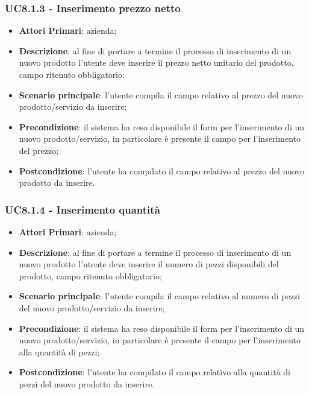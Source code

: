 \subsubsection{UC8.1.3 - Inserimento prezzo netto}
\begin{itemize}
	\item \textbf{Attori Primari}: azienda;
	\item \textbf{Descrizione}: al fine di portare a termine il processo di inserimento di un nuovo prodotto l'utente deve inserire il prezzo netto unitario del prodotto, campo ritenuto obbligatorio;
	\item \textbf{Scenario principale}: l'utente compila il campo relativo al prezzo del nuovo prodotto/servizio da inserire;
	\item \textbf{Precondizione}: il sistema ha reso disponibile il form per l'inserimento di un nuovo prodotto/servizio, in particolare è presente il campo per l'inserimento del prezzo;
	\item \textbf{Postcondizione}: l'utente ha compilato il campo relativo al prezzo del nuovo prodotto da inserire.
\end{itemize}
\subsubsection{UC8.1.4 - Inserimento quantità}
\begin{itemize}
	\item \textbf{Attori Primari}: azienda;
	\item \textbf{Descrizione}: al fine di portare a termine il processo di inserimento di un nuovo prodotto l'utente deve inserire il numero di pezzi disponibili del prodotto, campo ritenuto obbligatorio;
	\item \textbf{Scenario principale}: l'utente compila il campo relativo al numero di pezzi del nuovo prodotto/servizio da inserire;
	\item \textbf{Precondizione}: il sistema ha reso disponibile il form per l'inserimento di un nuovo prodotto/servizio, in particolare è presente il campo per l'inserimento alla quantità di pezzi;
	\item \textbf{Postcondizione}: l'utente ha compilato il campo relativo alla quantità di pezzi del nuovo prodotto da inserire.
\end{itemize}
